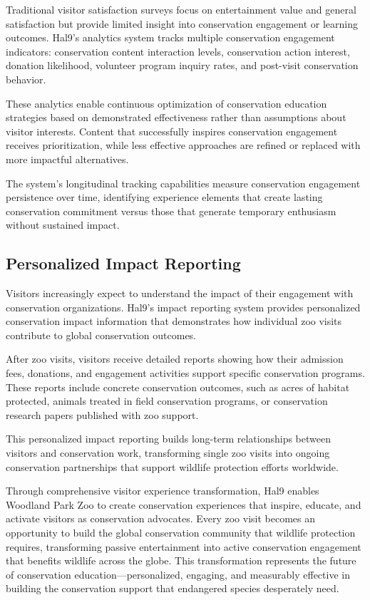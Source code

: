 \documentclass[
  Letterpaper,
]{scrbook}
\begin{document}
Traditional visitor satisfaction surveys focus on entertainment value
and general satisfaction but provide limited insight into conservation
engagement or learning outcomes. Hal9's analytics system tracks multiple
conservation engagement indicators: conservation content interaction
levels, conservation action interest, donation likelihood, volunteer
program inquiry rates, and post-visit conservation behavior.

These analytics enable continuous optimization of conservation education
strategies based on demonstrated effectiveness rather than assumptions
about visitor interests. Content that successfully inspires conservation
engagement receives prioritization, while less effective approaches are
refined or replaced with more impactful alternatives.

The system's longitudinal tracking capabilities measure conservation
engagement persistence over time, identifying experience elements that
create lasting conservation commitment versus those that generate
temporary enthusiasm without sustained impact.

\subsection{Personalized Impact
Reporting}\label{personalized-impact-reporting}

Visitors increasingly expect to understand the impact of their
engagement with conservation organizations. Hal9's impact reporting
system provides personalized conservation impact information that
demonstrates how individual zoo visits contribute to global conservation
outcomes.

After zoo visits, visitors receive detailed reports showing how their
admission fees, donations, and engagement activities support specific
conservation programs. These reports include concrete conservation
outcomes, such as acres of habitat protected, animals treated in field
conservation programs, or conservation research papers published with
zoo support.

This personalized impact reporting builds long-term relationships
between visitors and conservation work, transforming single zoo visits
into ongoing conservation partnerships that support wildlife protection
efforts worldwide.

Through comprehensive visitor experience transformation, Hal9 enables
Woodland Park Zoo to create conservation experiences that inspire,
educate, and activate visitors as conservation advocates. Every zoo
visit becomes an opportunity to build the global conservation community
that wildlife protection requires, transforming passive entertainment
into active conservation engagement that benefits wildlife across the
globe. This transformation represents the future of conservation
education---personalized, engaging, and measurably effective in building
the conservation support that endangered species desperately need.
\end{document}
